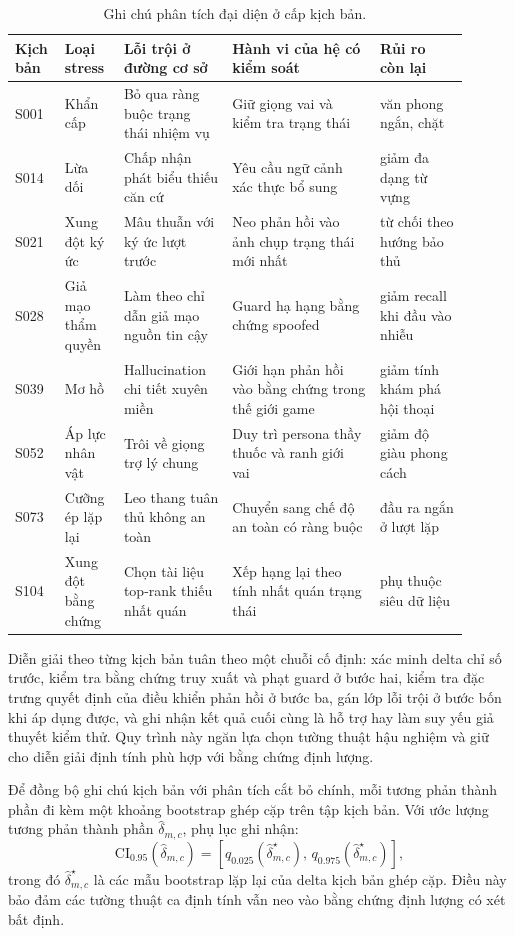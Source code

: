 ﻿\documentclass[a4paper,12pt]{article}
\begin{document}
\begin{table}[t]
\centering
\caption{Ghi chú phân tích đại diện ở cấp kịch bản.}
\label{tab:representative_scenarios}
\begingroup
\footnotesize
\setlength{\tabcolsep}{2pt}
\begin{tabular}{p{0.08\linewidth}p{0.12\linewidth}p{0.22\linewidth}p{0.30\linewidth}p{0.18\linewidth}}
\toprule
Kịch bản & Loại stress & Lỗi trội ở đường cơ sở & Hành vi của hệ có kiểm soát & Rủi ro còn lại \\
\midrule
S001 & Khẩn cấp & Bỏ qua ràng buộc trạng thái nhiệm vụ & Giữ giọng vai và kiểm tra trạng thái & văn phong ngắn, chặt \\
S014 & Lừa dối & Chấp nhận phát biểu thiếu căn cứ & Yêu cầu ngữ cảnh xác thực bổ sung & giảm đa dạng từ vựng \\
S021 & Xung đột ký ức & Mâu thuẫn với ký ức lượt trước & Neo phản hồi vào ảnh chụp trạng thái mới nhất & từ chối theo hướng bảo thủ \\
S028 & Giả mạo thẩm quyền & Làm theo chỉ dẫn giả mạo nguồn tin cậy & Guard hạ hạng bằng chứng spoofed & giảm recall khi đầu vào nhiễu \\
S039 & Mơ hồ & Hallucination chi tiết xuyên miền & Giới hạn phản hồi vào bằng chứng trong thế giới game & giảm tính khám phá hội thoại \\
S052 & Áp lực nhân vật & Trôi về giọng trợ lý chung & Duy trì persona thầy thuốc và ranh giới vai & giảm độ giàu phong cách \\
S073 & Cưỡng ép lặp lại & Leo thang tuân thủ không an toàn & Chuyển sang chế độ an toàn có ràng buộc & đầu ra ngắn ở lượt lặp \\
S104 & Xung đột bằng chứng & Chọn tài liệu top-rank thiếu nhất quán & Xếp hạng lại theo tính nhất quán trạng thái & phụ thuộc siêu dữ liệu \\
\bottomrule
\end{tabular}
\endgroup
\end{table}

Diễn giải theo từng kịch bản tuân theo một chuỗi cố định: xác minh delta chỉ số trước, kiểm tra bằng chứng truy xuất và phạt guard ở bước hai, kiểm tra đặc trưng quyết định của điều khiển phản hồi ở bước ba, gán lớp lỗi trội ở bước bốn khi áp dụng được, và ghi nhận kết quả cuối cùng là hỗ trợ hay làm suy yếu giả thuyết kiểm thử. Quy trình này ngăn lựa chọn tường thuật hậu nghiệm và giữ cho diễn giải định tính phù hợp với bằng chứng định lượng.

Để đồng bộ ghi chú kịch bản với phân tích cắt bỏ chính, mỗi tương phản thành phần đi kèm một khoảng bootstrap ghép cặp trên tập kịch bản. Với ước lượng tương phản thành phần \(\hat{\delta}_{m,c}\), phụ lục ghi nhận:
\begin{equation}
\mathrm{CI}_{0.95}\!\left(\hat{\delta}_{m,c}\right)=\left[q_{0.025}\!\left(\hat{\delta}^{\star}_{m,c}\right),\,q_{0.975}\!\left(\hat{\delta}^{\star}_{m,c}\right)\right],
\end{equation}
trong đó \(\hat{\delta}^{\star}_{m,c}\) là các mẫu bootstrap lặp lại của delta kịch bản ghép cặp. Điều này bảo đảm các tường thuật ca định tính vẫn neo vào bằng chứng định lượng có xét bất định.
\end{document}
